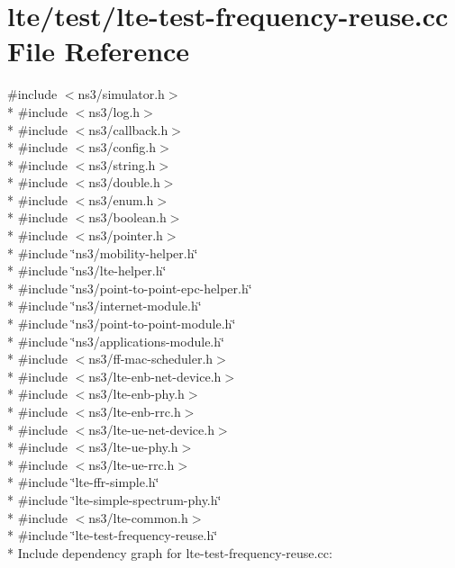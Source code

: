 \hypertarget{lte-test-frequency-reuse_8cc}{}\section{lte/test/lte-\/test-\/frequency-\/reuse.cc File Reference}
\label{lte-test-frequency-reuse_8cc}
{\ttfamily \#include $<$ns3/simulator.\+h$>$}\\*
{\ttfamily \#include $<$ns3/log.\+h$>$}\\*
{\ttfamily \#include $<$ns3/callback.\+h$>$}\\*
{\ttfamily \#include $<$ns3/config.\+h$>$}\\*
{\ttfamily \#include $<$ns3/string.\+h$>$}\\*
{\ttfamily \#include $<$ns3/double.\+h$>$}\\*
{\ttfamily \#include $<$ns3/enum.\+h$>$}\\*
{\ttfamily \#include $<$ns3/boolean.\+h$>$}\\*
{\ttfamily \#include $<$ns3/pointer.\+h$>$}\\*
{\ttfamily \#include \char`\"{}ns3/mobility-\/helper.\+h\char`\"{}}\\*
{\ttfamily \#include \char`\"{}ns3/lte-\/helper.\+h\char`\"{}}\\*
{\ttfamily \#include \char`\"{}ns3/point-\/to-\/point-\/epc-\/helper.\+h\char`\"{}}\\*
{\ttfamily \#include \char`\"{}ns3/internet-\/module.\+h\char`\"{}}\\*
{\ttfamily \#include \char`\"{}ns3/point-\/to-\/point-\/module.\+h\char`\"{}}\\*
{\ttfamily \#include \char`\"{}ns3/applications-\/module.\+h\char`\"{}}\\*
{\ttfamily \#include $<$ns3/ff-\/mac-\/scheduler.\+h$>$}\\*
{\ttfamily \#include $<$ns3/lte-\/enb-\/net-\/device.\+h$>$}\\*
{\ttfamily \#include $<$ns3/lte-\/enb-\/phy.\+h$>$}\\*
{\ttfamily \#include $<$ns3/lte-\/enb-\/rrc.\+h$>$}\\*
{\ttfamily \#include $<$ns3/lte-\/ue-\/net-\/device.\+h$>$}\\*
{\ttfamily \#include $<$ns3/lte-\/ue-\/phy.\+h$>$}\\*
{\ttfamily \#include $<$ns3/lte-\/ue-\/rrc.\+h$>$}\\*
{\ttfamily \#include \char`\"{}lte-\/ffr-\/simple.\+h\char`\"{}}\\*
{\ttfamily \#include \char`\"{}lte-\/simple-\/spectrum-\/phy.\+h\char`\"{}}\\*
{\ttfamily \#include $<$ns3/lte-\/common.\+h$>$}\\*
{\ttfamily \#include \char`\"{}lte-\/test-\/frequency-\/reuse.\+h\char`\"{}}\\*
Include dependency graph for lte-\/test-\/frequency-\/reuse.cc\+:
